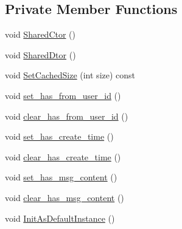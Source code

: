\subsection*{Private Member Functions}
\begin{DoxyCompactItemize}
\item 
void \hyperlink{class_i_m_1_1_base_define_1_1_client_group_msg_a4af7cffdbf7d3ab726243d92603c77db}{Shared\+Ctor} ()
\item 
void \hyperlink{class_i_m_1_1_base_define_1_1_client_group_msg_a39c330b320c216918b59c50d1a8b29b0}{Shared\+Dtor} ()
\item 
void \hyperlink{class_i_m_1_1_base_define_1_1_client_group_msg_a063cf6696c4cf5f20608fc4871338b48}{Set\+Cached\+Size} (int size) const 
\item 
void \hyperlink{class_i_m_1_1_base_define_1_1_client_group_msg_ac5adfe253d7f57cab1a2e6fb91ab12af}{set\+\_\+has\+\_\+from\+\_\+user\+\_\+id} ()
\item 
void \hyperlink{class_i_m_1_1_base_define_1_1_client_group_msg_aea227dc5005d16cc78af3732a924056d}{clear\+\_\+has\+\_\+from\+\_\+user\+\_\+id} ()
\item 
void \hyperlink{class_i_m_1_1_base_define_1_1_client_group_msg_aea5b10c1b42a09fb298dd2d44aebb1e6}{set\+\_\+has\+\_\+create\+\_\+time} ()
\item 
void \hyperlink{class_i_m_1_1_base_define_1_1_client_group_msg_a3a5adea59c5137b833dee27291a51ee8}{clear\+\_\+has\+\_\+create\+\_\+time} ()
\item 
void \hyperlink{class_i_m_1_1_base_define_1_1_client_group_msg_a6cf0433810c683710a95a7e393efd5fe}{set\+\_\+has\+\_\+msg\+\_\+content} ()
\item 
void \hyperlink{class_i_m_1_1_base_define_1_1_client_group_msg_a21ce4f54aa307029302678d119e4d77d}{clear\+\_\+has\+\_\+msg\+\_\+content} ()
\item 
void \hyperlink{class_i_m_1_1_base_define_1_1_client_group_msg_afcae97b0abd071bd68d736bc5abefa5e}{Init\+As\+Default\+Instance} ()
\end{DoxyCompactItemize}
